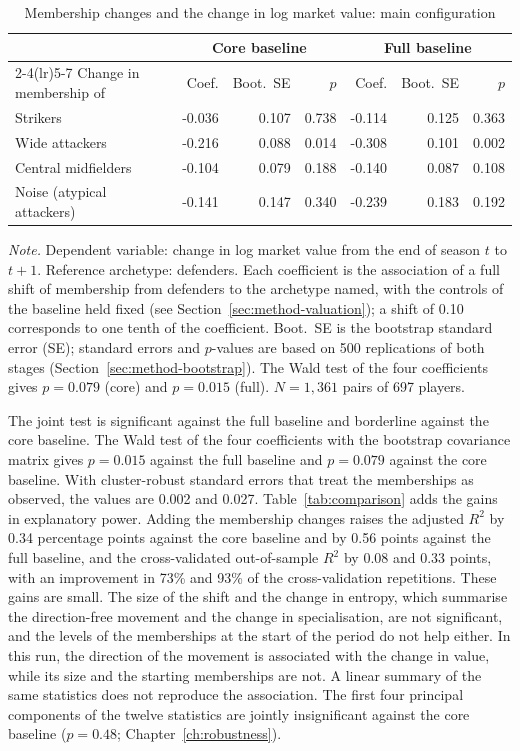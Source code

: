 \begin{table}[ht]
	\centering
	\small
	\caption{Membership changes and the change in log market value: main configuration}
	\label{tab:main}
	\begin{tabular}{lrrrrrr}
		\toprule
		 & \multicolumn{3}{c}{Core baseline} & \multicolumn{3}{c}{Full baseline} \\
		\cmidrule(lr){2-4}\cmidrule(lr){5-7}
		Change in membership of & Coef. & Boot.\ SE & $p$ & Coef. & Boot.\ SE & $p$ \\
		\midrule
Strikers & -0.036 & 0.107 & 0.738 & -0.114 & 0.125 & 0.363 \\
Wide attackers & -0.216 & 0.088 & 0.014 & -0.308 & 0.101 & 0.002 \\
Central midfielders & -0.104 & 0.079 & 0.188 & -0.140 & 0.087 & 0.108 \\
Noise (atypical attackers) & -0.141 & 0.147 & 0.340 & -0.239 & 0.183 & 0.192 \\
		\bottomrule
	\end{tabular}
	\par\smallskip
	\parbox{0.95\textwidth}{\footnotesize\emph{Note.} Dependent variable: change in log market value from the end of season $t$ to $t+1$. Reference archetype: defenders. Each coefficient is the association of a full shift of membership from defenders to the archetype named, with the controls of the baseline held fixed (see Section~\ref{sec:method-valuation}); a shift of 0.10 corresponds to one tenth of the coefficient. Boot.\ SE is the bootstrap standard error (SE); standard errors and $p$-values are based on 500 replications of both stages (Section~\ref{sec:method-bootstrap}). The Wald test of the four coefficients gives $p=0.079$ (core) and $p=0.015$ (full). $N=1{,}361$ pairs of 697 players.}
\end{table}

The joint test is significant against the full baseline and borderline against the core baseline. The Wald test of the four coefficients with the bootstrap covariance matrix gives $p=0.015$ against the full baseline and $p=0.079$ against the core baseline. With cluster-robust standard errors that treat the memberships as observed, the values are 0.002 and 0.027. Table~\ref{tab:comparison} adds the gains in explanatory power. Adding the membership changes raises the adjusted $R^2$ by 0.34 percentage points against the core baseline and by 0.56 points against the full baseline, and the cross-validated out-of-sample $R^2$ by 0.08 and 0.33 points, with an improvement in 73\% and 93\% of the cross-validation repetitions. These gains are small. The size of the shift and the change in entropy, which summarise the direction-free movement and the change in specialisation, are not significant, and the levels of the memberships at the start of the period do not help either. In this run, the direction of the movement is associated with the change in value, while its size and the starting memberships are not. A linear summary of the same statistics does not reproduce the association. The first four principal components of the twelve statistics are jointly insignificant against the core baseline ($p=0.48$; Chapter~\ref{ch:robustness}).

